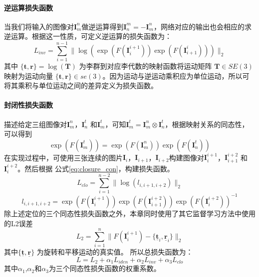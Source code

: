 \paragraph{逆运算损失函数}
当我们将输入的图像对$\mathbf{I}_m^n$做逆运算得到$\mathbf{I}_n^m = -\mathbf{I}_m^n$，网络对应的输出也会相应的求逆运算。根据这一性质，可定义逆运算的损失函数为：
\begin{equation}
    L_{inv} = \sum_{i=1}^{n-1} \|\log(\exp(F(\mathbf{I}_{i}^{i+1}))\exp(F(\mathbf{I}_{i+1}^{i})))\|_2
    \label{eq:inverse_loss}
\end{equation}
其中 $\{\mathbf{t},\mathbf{r}\} = \log(\mathbf{T})$ 为李群到对应李代数的映射函数将运动矩阵 $\mathbf{T} \in SE(3)$ 
映射为运动向量 $\{\mathbf{t},\mathbf{r}\} \in se(3)$。因为运动与逆运动乘积应为单位运动，所以可将其乘积与单位运动之间的差异定义为损失函数。

\paragraph{封闭性损失函数} 描述给定三组图像对$\mathbf{I}_m^n$，$\mathbf{I}_n^t$ 和$\mathbf{I}_m^t$，可知$\mathbf{I}_m^t = \mathbf{I}_m^n \otimes \mathbf{I}_n^t$，根据映射关系的同态性，可以得到
\begin{equation}
    \exp(F(\mathbf{I}_m^t)) = \exp(F(\mathbf{I}_m^n))\exp(F(\mathbf{I}_n^t))
    \label{eq:closure_con}
\end{equation}
在实现过程中，可使用三张连续的图片$\mathbf{I}_i$，$\mathbf{I}_{i+1}$，$\mathbf{I}_{i+2}$构建图像对$\mathbf{I}_i^{i+1}$，$\mathbf{I}_{i+1}^{i+2}$ 和$\mathbf{I}_i^{i+2}$。然后根据
公式\eqref{eq:closure_con}，构建损失函数。
\begin{equation}
    L_{clo} = \sum_{i=1}^{n-2} \|\log(l_{i,i+1,i+2})\|_2
    \label{eq:closure_loss}
\end{equation}
$$ l_{i,i+1,i+2} = \exp(F(\mathbf{I}_{i}^{i+1}))\exp(F(\mathbf{I}_{i+1}^{i+2}))\exp(F(\mathbf{I}_{i}^{i+2}))^{-1}$$
除上述定位的三个同态性损失函数之外，本章同时使用了其它监督学习方法中使用的L2误差\cite{wang2017deepvo}
\begin{equation}
    L_2 = \sum_{i=1}^{n}\|F(\mathbf{I}_{i}^{i+1})-\{\mathbf{\underline{t}}_i,\mathbf{\underline{r}}_i\}\|_2
    \label{eq:l2_loss}
\end{equation}
其中$\{\mathbf{\underline{t}},\mathbf{\underline{r}}\}$ 为旋转和平移运动的真实值。
所以总损失函数为：
\begin{equation}
    L = L_2 + \alpha_1 L_{iden} +\alpha_2L_{inv}+\alpha_3L_{clo}
    \label{eq:loss}
\end{equation}
其中$\alpha_1$,$\alpha_2$和$\alpha_3$为三个同态性损失函数的权重系数。
